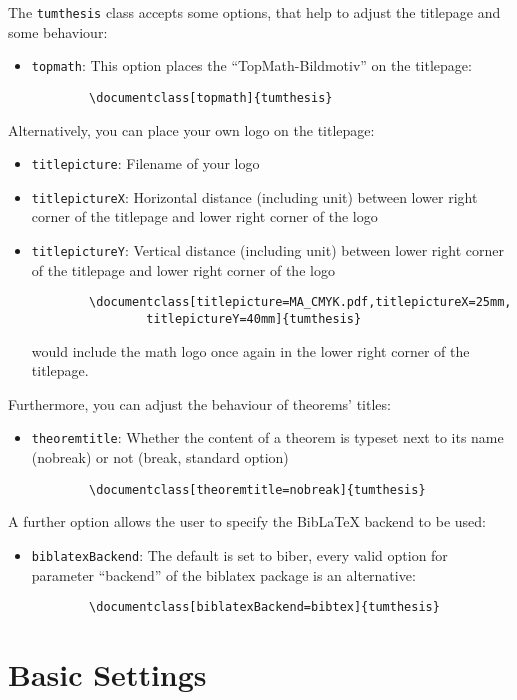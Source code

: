 The \texttt{tumthesis} class accepts some options, that help to adjust the titlepage and some behaviour:
\begin{itemize}
	\item \texttt{topmath}: This option places the \enquote{TopMath-Bildmotiv} on the titlepage:
		\begin{verbatim}
		\documentclass[topmath]{tumthesis}
		\end{verbatim}
\end{itemize}
Alternatively, you can place your own logo on the titlepage:
\begin{itemize}
	\item \texttt{titlepicture}: Filename of your logo
	\item \texttt{titlepictureX}: Horizontal distance (including unit) between lower right corner of the titlepage and lower right corner of the logo
	\item \texttt{titlepictureY}: Vertical distance (including unit) between lower right corner of the titlepage and lower right corner of the logo
		\begin{verbatim}
		\documentclass[titlepicture=MA_CMYK.pdf,titlepictureX=25mm,
				titlepictureY=40mm]{tumthesis}
		\end{verbatim}
        would include the math logo once again in the lower right corner of the titlepage.
\end{itemize}
Furthermore, you can adjust the behaviour of theorems' titles:
\begin{itemize}
	\item \texttt{theoremtitle}: Whether the content of a theorem is typeset next to its name (nobreak) or not (break, standard option)
		\begin{verbatim}
		\documentclass[theoremtitle=nobreak]{tumthesis}
		\end{verbatim}
\end{itemize}
A further option allows the user to specify the BibLaTeX backend to be used:
\begin{itemize}
	\item \texttt{biblatexBackend}: The default is set to biber, every valid option for parameter \enquote{backend} of the biblatex package is an alternative:
		\begin{verbatim}
		\documentclass[biblatexBackend=bibtex]{tumthesis}
		\end{verbatim}
\end{itemize}

\section{Basic Settings}
\label{sec:intro:settings}

